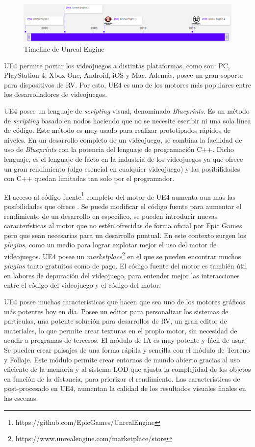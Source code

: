 \begin{figure}[h]
\centering
\includegraphics[width=15cm]{./images/timeline.png}
\caption{Timeline de Unreal Engine}
\end{figure}

\acs{UE4} permite portar los videojuegos a distintas plataformas, como son: PC, PlayStation 4, Xbox One, Android, iOS y Mac. Además, posee un gran soporte para dispositivos de \ac{RV}. Por esto, \acs{UE4} es uno de los motores más populares entre los desarrolladores de videojuegos. 

\acs{UE4} posee un lenguaje de \textit{scripting} visual, denominado \textit{Blueprints}. Es un método de \textit{scripting} basado en nodos haciendo que no se necesite escribir ni una sola línea de código. Este método es muy usado para realizar prototipados rápidos de niveles. En un desarrollo completo de un videojuego, se combina la facilidad de uso de \textit{Blueprints} con la potencia del lenguaje de programación C++. Dicho lenguaje, es el lenguaje de facto en la industria de los videojuegos ya que ofrece un gran rendimiento (algo esencial en cualquier videojuego) y las posibilidades con C++ quedan limitadas tan solo por el programador.

El acceso al código fuente\footnote{https://github.com/EpicGames/UnrealEngine} completo del motor de \acs{UE4} aumenta aun más las posibilidades que ofrece \cite{6}. Se puede modificar el código fuente para aumentar el rendimiento de un desarrollo en específico, se pueden introducir nuevas características al motor que no estén ofrecidas de forma oficial por Epic Games pero que sean necesarias para un desarrollo puntual. En este contexto surgen los \textit{plugins}, como un medio para lograr explotar mejor el uso del motor de videojuegos. \acs{UE4} posee un \textit{marketplace}\footnote{https://www.unrealengine.com/marketplace/store} en el que se pueden encontrar muchos \textit{plugins} tanto gratuitos como de pago. El código fuente del motor es también útil en labores de depuración del videojuego, para entender mejor las interacciones entre el código del videojuego y el código del motor.

\acs{UE4} posee muchas características que hacen que sea uno de los motores gráficos más potentes hoy en día. Posee un editor para personalizar los sistemas de partículas, una potente solución para desarrollos de \ac{RV}, un gran editor de materiales, lo que permite crear texturas en el propio motor, sin necesidad de acudir a programas de terceros. El módulo de \ac{IA} es muy potente y fácil de usar. Se pueden crear paisajes de una forma rápida y sencilla con el módulo de Terreno y Follaje. Este módulo permite crear entornos de mundo abierto gracias al uso eficiente de la memoria y al sistema \ac{LOD} que ajusta la complejidad de los objetos en función de la distancia, para priorizar el rendimiento. Las características de post-procesado en \acs{UE4}, aumentan la calidad de los resultados visuales finales en las escenas.

